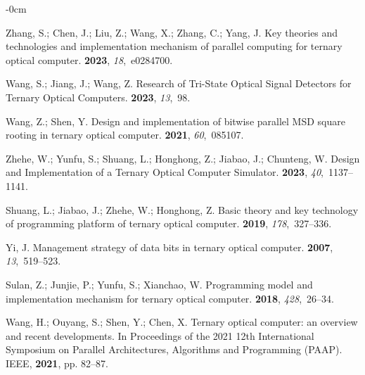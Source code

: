 \documentclass[electronics,article,accept,pdftex,moreauthors]{Definitions/mdpi}
\begin{document}
\begin{adjustwidth}{-\extralength}{0cm}


\begin{thebibliography}{999}

Zhang, S.; Chen, J.; Liu, Z.; Wang, X.; Zhang, C.; Yang, J.
\newblock Key theories and technologies and implementation mechanism of
  parallel computing for ternary optical computer.
 {\bf \textbf{2023}}, {\em 18},~e0284700.

Wang, S.; Jiang, J.; Wang, Z.
\newblock Research of Tri-State Optical Signal Detectors for Ternary Optical
  Computers.
 {\bf \textbf{2023}}, {\em 13},~98.

Wang, Z.; Shen, Y.
\newblock Design and implementation of bitwise parallel MSD square rooting in
  ternary optical computer.
 {\bf \textbf{2021}}, {\em
  60},~085107.

Zhehe, W.; Yunfu, S.; Shuang, L.; Honghong, Z.; Jiabao, J.; Chunteng, W.
\newblock Design and Implementation of a Ternary Optical Computer Simulator.
 {\bf \textbf{2023}},
  {\em 40},~1137--1141.

Shuang, L.; Jiabao, J.; Zhehe, W.; Honghong, Z.
\newblock Basic theory and key technology of programming platform of ternary
  optical computer.
 {\bf \textbf{2019}}, {\em 178},~327--336.

Yi, J.
\newblock Management strategy of data bits in ternary optical computer.
 {\bf \textbf{2007}}, {\em 13},~519--523.

Sulan, Z.; Junjie, P.; Yunfu, S.; Xianchao, W.
\newblock Programming model and implementation mechanism for ternary optical
  computer.
 {\bf \textbf{2018}}, {\em
  428},~26--34.

Wang, H.; Ouyang, S.; Shen, Y.; Chen, X.
\newblock Ternary optical computer: an overview and recent developments.
\newblock In Proceedings of the 2021 12th International Symposium on Parallel
  Architectures, Algorithms and Programming (PAAP). IEEE,  \textbf{2021}, pp.
  82--87.


\end{thebibliography}
\end{adjustwidth}
\end{document}
